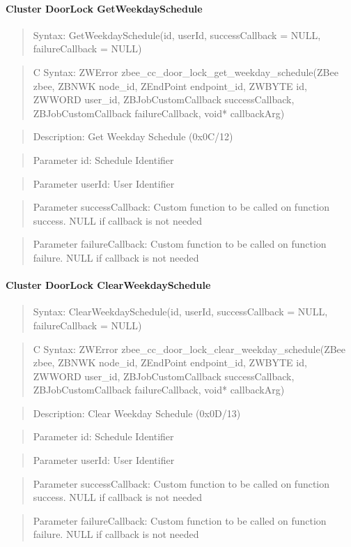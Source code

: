 \paragraph{Cluster DoorLock GetWeekdaySchedule}
\begin{quote}Syntax: GetWeekdaySchedule(id, userId, successCallback = NULL, failureCallback = NULL)\end{quote}
\begin{quote}C Syntax: ZWError zbee\_cc\_door\_lock\_get\_weekday\_schedule(ZBee zbee, ZBNWK node\_id, ZEndPoint endpoint\_id, ZWBYTE id, ZWWORD user\_id, ZBJobCustomCallback successCallback, ZBJobCustomCallback failureCallback, void* callbackArg)\end{quote}
\begin{quote}Description: Get Weekday Schedule (0x0C/12)\end{quote}
\begin{quote}Parameter id: Schedule Identifier\end{quote}
\begin{quote}Parameter userId: User Identifier\end{quote}
\begin{quote}Parameter successCallback: Custom function to be called on function success. NULL if callback is not needed\end{quote}
\begin{quote}Parameter failureCallback: Custom function to be called on function failure. NULL if callback is not needed\end{quote}


\paragraph{Cluster DoorLock ClearWeekdaySchedule}
\begin{quote}Syntax: ClearWeekdaySchedule(id, userId, successCallback = NULL, failureCallback = NULL)\end{quote}
\begin{quote}C Syntax: ZWError zbee\_cc\_door\_lock\_clear\_weekday\_schedule(ZBee zbee, ZBNWK node\_id, ZEndPoint endpoint\_id, ZWBYTE id, ZWWORD user\_id, ZBJobCustomCallback successCallback, ZBJobCustomCallback failureCallback, void* callbackArg)\end{quote}
\begin{quote}Description: Clear Weekday Schedule (0x0D/13)\end{quote}
\begin{quote}Parameter id: Schedule Identifier\end{quote}
\begin{quote}Parameter userId: User Identifier\end{quote}
\begin{quote}Parameter successCallback: Custom function to be called on function success. NULL if callback is not needed\end{quote}
\begin{quote}Parameter failureCallback: Custom function to be called on function failure. NULL if callback is not needed\end{quote}


